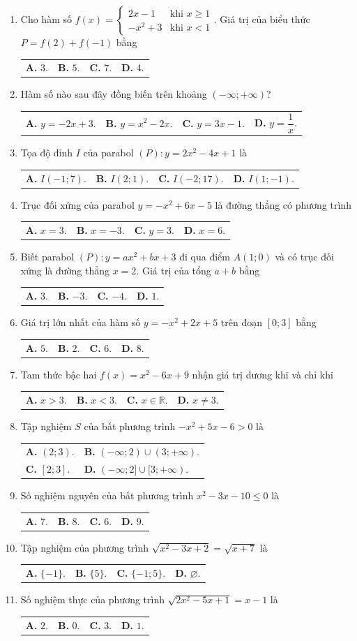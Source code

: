 \documentclass[12pt,a4paper]{article}
\makeatletter
\newcommand{\four}[4]{\par\noindent\begin{tabularx}{\linewidth}{@{}*{4}{>{\raggedright\arraybackslash}X}@{}}\textbf{A.} #1&\textbf{B.} #2&\textbf{C.} #3&\textbf{D.} #4\end{tabularx}}
\newcommand{\two}[4]{\par\noindent\begin{tabularx}{\linewidth}{@{}*{2}{>{\raggedright\arraybackslash}X}@{}}\textbf{A.} #1&\textbf{B.} #2\\[3.8pt]\textbf{C.} #3&\textbf{D.} #4\end{tabularx}}
\makeatother
\begin{document}
\begin{enumerate}
\item Cho hàm số $f(x) = \begin{cases} 2x - 1 & \text{khi } x \ge 1 \\ -x^2 + 3 & \text{khi } x < 1 \end{cases}$. Giá trị của biểu thức $P = f(2) + f(-1)$ bằng
\four{$3$.}{$5$.}{$7$.}{$4$.}

\item Hàm số nào sau đây đồng biến trên khoảng $(-\infty; +\infty)$?
\four{$y = -2x + 3$.}{$y = x^2 - 2x$.}{$y = 3x - 1$.}{$y = \dfrac{1}{x}$.}

\item Tọa độ đỉnh $I$ của parabol $(P): y = 2x^2 - 4x + 1$ là
\four{$I(-1; 7)$.}{$I(2; 1)$.}{$I(-2; 17)$.}{$I(1; -1)$.}

\item Trục đối xứng của parabol $y = -x^2 + 6x - 5$ là đường thẳng có phương trình
\four{$x = 3$.}{$x = -3$.}{$y = 3$.}{$x = 6$.}

\item Biết parabol $(P): y = ax^2 + bx + 3$ đi qua điểm $A(1; 0)$ và có trục đối xứng là đường thẳng $x = 2$. Giá trị của tổng $a + b$ bằng
\four{$3$.}{$-3$.}{$-4$.}{$1$.}

\item Giá trị lớn nhất của hàm số $y = -x^2 + 2x + 5$ trên đoạn $[0; 3]$ bằng
\four{$5$.}{$2$.}{$6$.}{$8$.}

\item Tam thức bậc hai $f(x) = x^2 - 6x + 9$ nhận giá trị dương khi và chỉ khi
\four{$x > 3$.}{$x < 3$.}{$x \in \mathbb{R}$.}{$x \ne 3$.}

\item Tập nghiệm $S$ của bất phương trình $-x^2 + 5x - 6 > 0$ là
\two{$(2; 3)$.}{$(-\infty; 2) \cup (3; +\infty)$.}{$[2; 3]$.}{$(-\infty; 2] \cup [3; +\infty)$.}

\item Số nghiệm nguyên của bất phương trình $x^2 - 3x - 10 \le 0$ là
\four{$7$.}{$8$.}{$6$.}{$9$.}

\item Tập nghiệm của phương trình $\sqrt{x^2 - 3x + 2} = \sqrt{x + 7}$ là
\four{$\{-1\}$.}{$\{5\}$.}{$\{-1; 5\}$.}{$\varnothing$.}

\item Số nghiệm thực của phương trình $\sqrt{2x^2 - 5x + 1} = x - 1$ là
\four{$2$.}{$0$.}{$3$.}{$1$.}
\end{enumerate}
\end{document}
